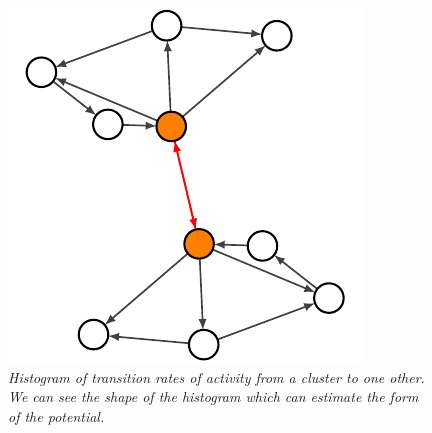 \begin{figure}[h]
\centering
\includegraphics[scale=1.4]{images/doublecluster.pdf}
\caption{\emph{Histogram of transition rates of activity from a cluster to one other. We can see the shape of the histogram which can estimate the form of the potential.}}
\label{fig:times}
\end{figure}

